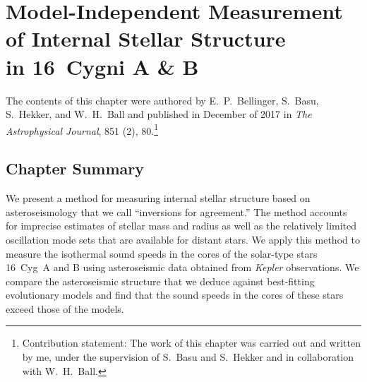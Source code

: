 \chapter{Model-Independent Measurement of Internal Stellar Structure \\in 16~Cygni A \& B}
\label{chap:inversion}

\vspace{2cm}
The contents of this chapter were authored by E.~P.~Bellinger, S.~Basu, S.~Hekker, and W.~H.~Ball and published in December of 2017 in \emph{The Astrophysical Journal}, 851 (2), 80.\footnote{Contribution statement: The work of this chapter was carried out and written by me, under the supervision of S.~Basu and S.~Hekker and in collaboration with W.~H.~Ball. } 
\nocite{2017ApJ...851...80B}

\vspace*{1cm}

\section*{Chapter Summary}
We present a method for measuring internal stellar structure based on asteroseismology that we call ``inversions for agreement.'' 
The method accounts for imprecise estimates of stellar mass and radius as well as the relatively limited oscillation mode sets that are available for distant stars. 
We apply this method to measure the isothermal sound speeds in the cores of the solar-type stars 16~Cyg~A and B using asteroseismic data obtained from \emph{Kepler} observations. 
We compare the asteroseismic structure that we deduce against best-fitting evolutionary models and find that the sound speeds in the cores of these stars exceed those of the models. 
\newpage
